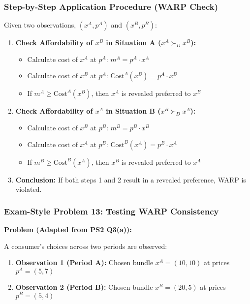 \documentclass{article}
\begin{document}
\subsubsection*{Step-by-Step Application Procedure (WARP Check)}

Given two observations, $(x^A, p^A)$ and $(x^B, p^B)$:

\begin{enumerate}
    \item \textbf{Check Affordability of $x^B$ in Situation A ($x^A \succ_D x^B$):}
    \begin{itemize}
        \item Calculate cost of $x^A$ at $p^A$: $m^A = p^A \cdot x^A$
        \item Calculate cost of $x^B$ at $p^A$: $\text{Cost}^A(x^B) = p^A \cdot x^B$
        \item If $m^A \geq \text{Cost}^A(x^B)$, then $x^A$ is revealed preferred to $x^B$
    \end{itemize}
    \item \textbf{Check Affordability of $x^A$ in Situation B ($x^B \succ_D x^A$):}
    \begin{itemize}
        \item Calculate cost of $x^B$ at $p^B$: $m^B = p^B \cdot x^B$
        \item Calculate cost of $x^A$ at $p^B$: $\text{Cost}^B(x^A) = p^B \cdot x^A$
        \item If $m^B \geq \text{Cost}^B(x^A)$, then $x^B$ is revealed preferred to $x^A$
    \end{itemize}
    \item \textbf{Conclusion:} If both steps 1 and 2 result in a revealed preference, WARP is violated.
\end{enumerate}

\subsubsection*{Exam-Style Problem 13: Testing WARP Consistency}

\textbf{Problem (Adapted from PS2 Q3(a)):}

A consumer's choices across two periods are observed:

\begin{enumerate}
    \item \textbf{Observation 1 (Period A):} Chosen bundle $x^A = (10, 10)$ at prices $p^A = (5, 7)$
    \item \textbf{Observation 2 (Period B):} Chosen bundle $x^B = (20, 5)$ at prices $p^B = (5, 4)$
\end{enumerate}
\end{document}
